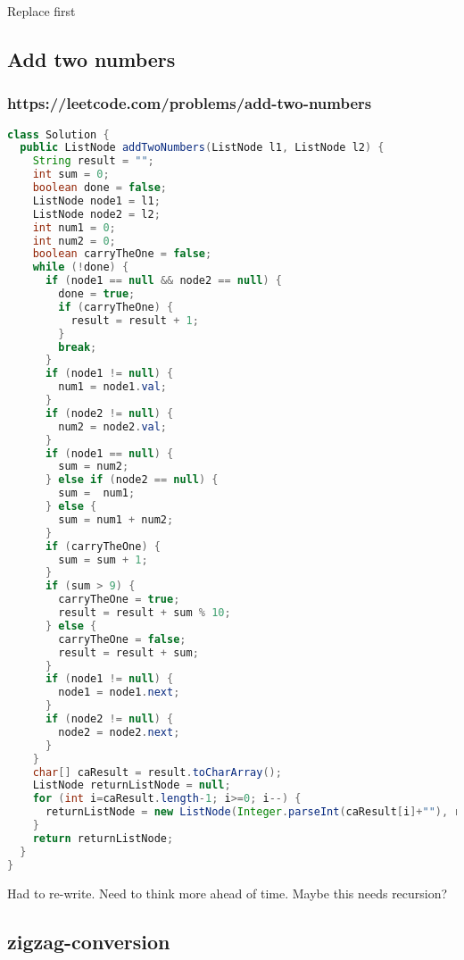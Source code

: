 \documentclass[12pt]{article}
\begin{document}
Replace first

\subsection{Add two numbers} 
\subsubsection{https://leetcode.com/problems/add-two-numbers}
\begin{lstlisting}[language=Java]
class Solution {
  public ListNode addTwoNumbers(ListNode l1, ListNode l2) {
    String result = "";
    int sum = 0;
    boolean done = false;
    ListNode node1 = l1;
    ListNode node2 = l2;
    int num1 = 0;
    int num2 = 0;
    boolean carryTheOne = false;
    while (!done) {
      if (node1 == null && node2 == null) {
        done = true;
        if (carryTheOne) {
          result = result + 1;
        }
        break;
      }            
      if (node1 != null) {
        num1 = node1.val;
      }
      if (node2 != null) {
        num2 = node2.val;
      }
      if (node1 == null) {
        sum = num2;
      } else if (node2 == null) {
        sum =  num1;
      } else {
        sum = num1 + num2;
      }
      if (carryTheOne) {
        sum = sum + 1;
      }
      if (sum > 9) {
        carryTheOne = true;
        result = result + sum % 10;
      } else {
        carryTheOne = false;
        result = result + sum;
      }
      if (node1 != null) {
        node1 = node1.next;
      }
      if (node2 != null) {
        node2 = node2.next;
      }
    }
    char[] caResult = result.toCharArray();
    ListNode returnListNode = null;
    for (int i=caResult.length-1; i>=0; i--) {
      returnListNode = new ListNode(Integer.parseInt(caResult[i]+""), returnListNode);
    }
    return returnListNode;
  }
}
\end{lstlisting}

Had to re-write. Need to think more ahead of time. Maybe this needs recursion?

\subsection{zigzag-conversion} 
\end{document}
